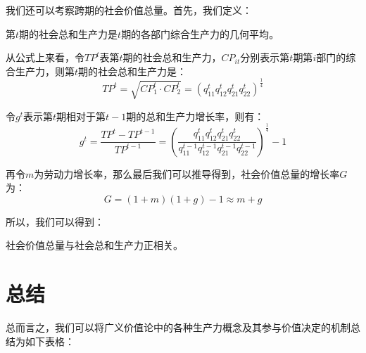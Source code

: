 我们还可以考察跨期的社会价值总量。首先，我们定义：
\begin{definition}
    第$t$期的社会总和生产力是$t$期的各部门综合生产力的几何平均\cite[291]{CaiJiMingCongGuDianZhengZhiJingJiXueDaoZhongGuoTeSeSheHuiZhuYiZhengZhiJingJiXueJiYuZhongGuoShiJiaoDeZhengZhiJingJiXueYanBianShangCe2023}。
\end{definition}

从公式上来看，令$\mathit{TP}^t$表第$t$期的社会总和生产力，$CP_{it}$分别表示第$t$期第$i$部门的综合生产力，则第$t$期的社会总和生产力是\cite[291]{CaiJiMingCongGuDianZhengZhiJingJiXueDaoZhongGuoTeSeSheHuiZhuYiZhengZhiJingJiXueJiYuZhongGuoShiJiaoDeZhengZhiJingJiXueYanBianShangCe2023}：
\begin{equation}
    \mathit{TP}^t = \sqrt{\mathit{CP}_1^t \cdot \mathit{CP}_2^t} = \left( q_{11}^t q_{12}^t q_{21}^t q_{22}^t \right)^\frac{1}{4}
\end{equation}

令$g^t$表示第$t$期相对于第$t-1$期的总和生产力增长率，则有\cite[291]{CaiJiMingCongGuDianZhengZhiJingJiXueDaoZhongGuoTeSeSheHuiZhuYiZhengZhiJingJiXueJiYuZhongGuoShiJiaoDeZhengZhiJingJiXueYanBianShangCe2023}：
\begin{equation}
    g^t = \frac{\mathit{TP}^t - \mathit{TP}^{t-1}}{\mathit{TP}^{t-1}} = \left( \frac{q_{11}^t q_{12}^t q_{21}^t q_{22}^t}{q_{11}^{t-1} q_{12}^{t-1} q_{21}^{t-1} q_{22}^{t-1}} \right)^\frac{1}{4} - 1
\end{equation}

再令$m$为劳动力增长率，那么最后我们可以推导得到，社会价值总量的增长率$G$为：
\begin{equation}
    G = \left( 1+m \right) \left( 1+g \right) - 1 \approx m + g
\end{equation}

所以，我们可以得到：
\begin{theorem}
    社会价值总量与社会总和生产力正相关\cite[291]{CaiJiMingCongXiaYiJieZhiLunDaoGuangYiJieZhiLunXiuDingBan2022}。
\end{theorem}

\section{总结}

总而言之，我们可以将广义价值论中的各种生产力概念及其参与价值决定的机制总结为如下表格：

